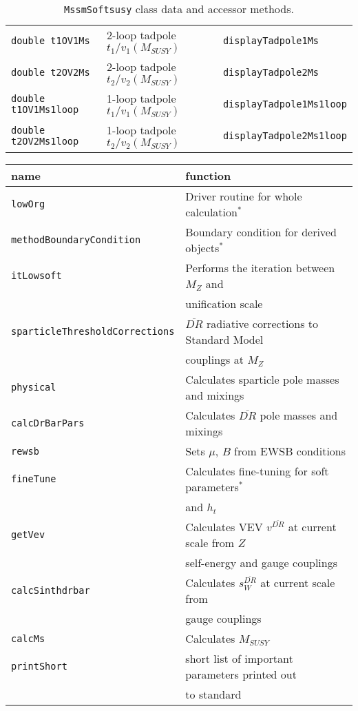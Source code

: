 \documentclass[]{article}
\def\code#1{\small{\tt #1}\normalsize}
\begin{document}
\begin{table}
\begin{center}
\begin{tabular}{lll}
\code{double t1OV1Ms} & 2-loop tadpole $t_1/v_1(M_{SUSY})$ & \code{displayTadpole1Ms} \\
\code{double t2OV2Ms} & 2-loop tadpole $t_2/v_2(M_{SUSY})$ & \code{displayTadpole2Ms} \\
\code{double t1OV1Ms1loop} & 1-loop tadpole $t_1/v_1(M_{SUSY})$ & \code{displayTadpole1Ms1loop} \\
\code{double t2OV2Ms1loop} & 1-loop tadpole $t_2/v_2(M_{SUSY})$ & \code{displayTadpole2Ms1loop} \\
\hline
\end{tabular}\caption{\label{tab:mssmsoftdata}\code{MssmSoftsusy} class data and accessor methods.}\end{center}\end{table}

\begin{table}\begin{center}\begin{tabular}{ll} 
name & function \\ \hline
\code{lowOrg} & Driver routine for whole calculation$^*$\\ 
\code{methodBoundaryCondition} & Boundary condition for derived objects$^*$\\
\code{itLowsoft} & Performs the iteration between $M_Z$ and \\
 &unification scale\\  
\code{sparticleThresholdCorrections} & $\overline{DR}$ radiative corrections
to Standard Model \\
 & couplings at $M_Z$\\ 
\code{physical} & Calculates sparticle pole masses and mixings\\ 
\code{calcDrBarPars} & Calculates $\overline{DR}$ pole masses and mixings\\ 
\code{rewsb} & Sets $\mu$, $B$ from EWSB conditions\\ 
\code{fineTune} & Calculates fine-tuning for soft parameters$^*$ \\ & and
$h_t$\\ 
\code{getVev} & Calculates VEV $v^{\overline{DR}}$ at current scale from $Z$\\
 & self-energy and gauge couplings\\ 
\code{calcSinthdrbar} & Calculates $s_W^{\overline{DR}}$ at current scale
from\\  & gauge couplings \\
\code{calcMs} & Calculates $M_{SUSY}$\\ 
\code{printShort} & short list of important parameters printed out \\ &to standard

\end{tabular}
\end{center}
\end{table}
\end{document}
